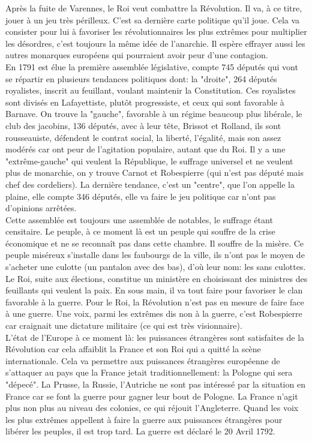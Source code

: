 \documentclass[10pt, a4paper, openany]{book}
\begin{document}
Après la fuite de Varennes, le Roi veut combattre la Révolution. Il va, à ce titre, jouer à un jeu très périlleux. C'est sa dernière carte politique qu'il joue. Cela va consister pour lui à favoriser les révolutionnaires les plus extrêmes pour multiplier les désordres, c'est toujours la même idée de l'anarchie. Il espère effrayer aussi les autres monarques européens qui pourraient avoir peur d'une contagion. \\
En 1791 est élue la première assemblée législative, compte 745 députés qui vont se répartir en plusieurs tendances politiques dont: la "droite", 264 députés royalistes, inscrit au feuillant, voulant maintenir la Constitution. Ces royalistes sont divisés en Lafayettiste, plutôt progressiste, et ceux qui sont favorable à Barnave. On trouve la "gauche", favorable à un régime beaucoup plus libérale, le club des jacobins, 136 députés, avec à leur tête, Brissot et Rolland, ils sont rousseauiste, défendent le contrat social, la liberté, l'égalité, mais son assez modérés car ont peur de l'agitation populaire, autant que du Roi. Il y a une "extrême-gauche" qui veulent la République, le suffrage universel et ne veulent plus de monarchie, on y trouve Carnot et Robespierre (qui n'est pas député mais chef des cordeliers). La dernière tendance, c'est un "centre", que l'on appelle la plaine, elle compte 346 députés, elle va faire le jeu politique car n'ont pas d'opinions arrêtées. \\
Cette assemblée est toujours une assemblée de notables, le suffrage étant censitaire. Le peuple, à ce moment là est un peuple qui souffre de la crise économique et ne se reconnaît pas dans cette chambre. Il souffre de la misère. Ce peuple miséreux s'installe dans les faubourgs de la ville, ils n'ont pas le moyen de s'acheter une culotte (un pantalon avec des bas), d'où leur nom: les sans culottes. \\
Le Roi, suite aux élections, constitue un ministère en choisissant des ministres des feuillants qui veulent la paix. En sous main, il va tout faire pour favoriser le clan favorable à la guerre. Pour le Roi, la Révolution n'est pas en mesure de faire face à une guerre. Une voix, parmi les extrêmes dis non à la guerre, c'est Robespierre car craignait une dictature militaire (ce qui est très visionnaire). \\
L'état de l'Europe à ce moment là: les puissances étrangères sont satisfaites de la Révolution car cela affaiblit la France et son Roi qui a quitté la scène internationale. Cela va permettre aux puissances étrangères européenne de s'attaquer au pays que la France jetait traditionnellement: la Pologne qui sera "dépecé". La Prusse, la Russie, l'Autriche ne sont pas intéressé par la situation en France car se font la guerre pour gagner leur bout de Pologne. La France n'agit plus non plus au niveau des colonies, ce qui réjouit l'Angleterre. Quand les voix les plus extrêmes appellent à faire la guerre aux puissances étrangères pour libérer les peuples, il est trop tard. La guerre est déclaré le 20 Avril 1792. \\
\end{document}
